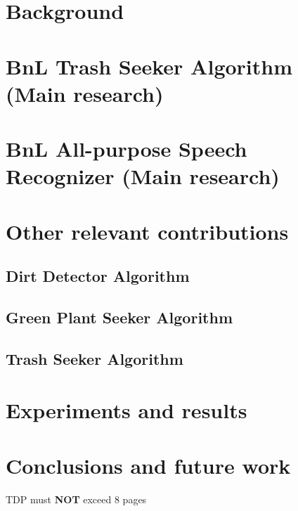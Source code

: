 \documentclass[12pt]{article}
\begin{document}
\section{Background}
\lipsum[1-2]

\section{BnL Trash Seeker Algorithm (Main research)}
\lipsum[4-5]

\section{BnL All-purpose Speech Recognizer (Main research)}
\lipsum[9-10]

\section{Other relevant contributions}
\lipsum[12]
\subsection{Dirt Detector Algorithm}
\lipsum[13]
\subsection{Green Plant Seeker Algorithm}
\lipsum[14]
\subsection{Trash Seeker Algorithm}
\lipsum[15]

\section{Experiments and results}
\lipsum[23-24]

\section{Conclusions and future work}
\lipsum[25]

%
%




{\vfill\begin{center}\huge\color{red}TDP must \textbf{NOT} exceed 8 pages\end{center}}

%
%

%
%
%

\nocite{*}
\end{document}
